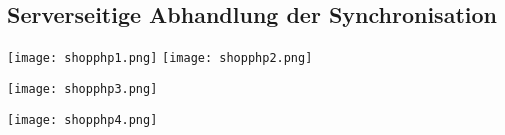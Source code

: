 \subsection{Serverseitige Abhandlung der Synchronisation}
\label{app:loadsalesphp}
\begin{center}
\texttt{[image: shopphp1.png]}
\texttt{[image: shopphp2.png]}
\end{center}
\begin{center}
\texttt{[image: shopphp3.png]}
\end{center}
\begin{center}
\texttt{[image: shopphp4.png]}
\end{center}